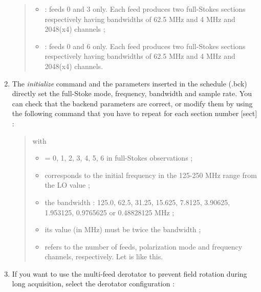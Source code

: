 \documentclass[letterpaper,10pt,english]{sphinxmanual}
\begin{document}
\begin{enumerate}
\begin{quote}
\begin{itemize}
\item {} 
 : feeds 0 and 3 only.
Each feed produces two full-Stokes sections respectively having
bandwidths of 62.5 MHz and 4 MHz and 2048(x4) channels ;

\item {} 
 : feeds 0 and 6 only.
Each feed produces two full-Stokes sections respectively having
bandwidths of 62.5 MHz and 4 MHz and 2048(x4) channels.

\end{itemize}
\end{quote}

\item {} 
The \emph{initialize} command and the parameters inserted in the schedule (.bck) directly set the full-Stoke mode, frequency, bandwidth and sample rate. You can check that the backend parameters are correct, or modify them by using the following command that you have to repeat for each section number {[}sect{]} :
\begin{quote}


with
\begin{itemize}
\item {} 
\code{{[}sect{]}} = 0, 1, 2, 3, 4, 5, 6 in full-Stokes observations ;

\item {} 
\code{{[}startFreq{]}} corresponds to the initial frequency in the
125-250 MHz range from the LO value ;

\item {} 
\code{{[}bw{]}} the bandwidth : 125.0, 62.5, 31.25, 15.625, 7.8125,
3.90625, 1.953125, 0.9765625 or 0.48828125 MHz ;

\item {} 
\code{{[}sampleRate{]}} its value (in MHz) must be twice the bandwidth ;

\item {} 
\code{*} refers to the number of feeds, polarization mode and
frequency channels, respectively. Let is like this.

\end{itemize}
\end{quote}

\item {} 
If you want to use the multi-feed derotator to prevent field rotation during long acquisition, select the derotator configuration :
\begin{quote}


\end{quote}
\end{enumerate}
\end{document}

